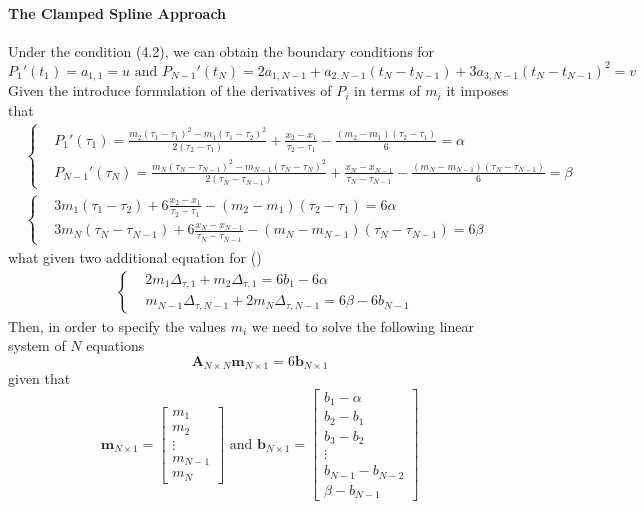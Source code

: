 \documentclass[article,moreauthors,pdftex,10pt,a4paper]{ssrn}
\begin{document}
\paragraph{The Clamped Spline Approach}
Under the condition (4.2), we can obtain the boundary conditions for 
\begin{equation*}
P_1'(t_1) = a_{1,1} = u \text{ and } P_{N-1}' (t_{N}) =   2 a_{1,N-1}  + a_{2,N-1} (t_N - t_{N-1}) + 3a_{3,N-1} (t_N - t_{N-1})^2 = v
\end{equation*}
Given the introduce formulation of the derivatives of $P_i$ in terms of $m_i$ it imposes that
\begin{align*}
& \begin{cases}
& P_1'(\tau_1) = \frac{m_2 (\tau_1 - \tau_1)^2 - m_1 (\tau_1 - \tau_2)^2}{2(\tau_2 - \tau_1)} +  \frac{x_2- x_1}{\tau_2 - \tau_1} - \frac{(m_2 - m_1) (\tau_2 - \tau_1)}{6} = \alpha \\
&P_{N-1}'(\tau_N) =  \frac{m_N (\tau_N - \tau_{N-1})^2 - m_{N-1} (\tau_N - \tau_N)^2}{2(\tau_N - \tau_{N-1})} +  \frac{x_N- x_{N-1}}{\tau_N - \tau_{N-1}} - \frac{(m_N - m_{N-1}) (\tau_N - \tau_{N-1})}{6} = \beta
\end{cases} \\
& \begin{cases}
& 3 m_1 (\tau_1 - \tau_2) + 6 \frac{x_2- x_1}{\tau_2 - \tau_1} - (m_2 - m_1) (\tau_2 - \tau_1) = 6\alpha \\
& 3 m_N (\tau_N - \tau_{N-1}) + 6\frac{x_N- x_{N-1}}{\tau_N - \tau_{N-1}} - (m_N - m_{N-1}) (\tau_N - \tau_{N-1}) = 6\beta
\end{cases}
\end{align*}
what given two additional equation for ()
\begin{align*}
& \begin{cases}
& 2 m_1 \Delta_{\tau,1} + m_2\Delta_{\tau,1}   = 6 b_1 - 6\alpha \\
& m_{N-1} \Delta_{\tau,N-1} + 2 m_N \Delta_{\tau,N-1} = 6\beta -  6b_{N-1}
\end{cases}
\end{align*}
Then, in order to specify the values $m_i$ we need to solve the following linear system of $N$ equations
\begin{equation}
\mathbf{A}_{N \times N} \mathbf{m}_{N \times 1} = 6 \mathbf{b}_{N \times 1}
\end{equation}
given that
\begin{equation*}
\mathbf{m}_{N \times 1} = \begin{bmatrix}
m_1 \\ m_2 \\ \vdots \\ m_{N-1}  \\ m_N
\end{bmatrix} \text{ and }
\mathbf{b}_{N \times 1} = \begin{bmatrix} 
b_1 - \alpha\\
b_2 - b_1 \\
b_3 - b_2\\
\vdots \\
b_{N-1} - b_{N-2}\\
\beta - b_{N-1}
\end{bmatrix}
\end{equation*}
\end{document}
